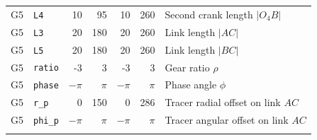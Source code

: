\begin{longtable}{@{}llrrrrp{4.3cm}@{}}
G5 & \texttt{L4} & 10 & 95 & 10 & 260 & Second crank length $|O_4B|$ \\
G5 & \texttt{L3} & 20 & 180 & 20 & 260 & Link length $|AC|$ \\
G5 & \texttt{L5} & 20 & 180 & 20 & 260 & Link length $|BC|$ \\
G5 & \texttt{ratio} & -3 & 3 & -3 & 3 & Gear ratio $\rho$ \\
G5 & \texttt{phase} & $-\pi$ & $\pi$ & $-\pi$ & $\pi$ & Phase angle $\phi$ \\
G5 & \texttt{r\_p} & 0 & 150 & 0 & 286 & Tracer radial offset on link $AC$ \\
G5 & \texttt{phi\_p} & $-\pi$ & $\pi$ & $-\pi$ & $\pi$ & Tracer angular offset on link $AC$ \\
\addlinespace
\bottomrule\end{longtable}\normalsize
